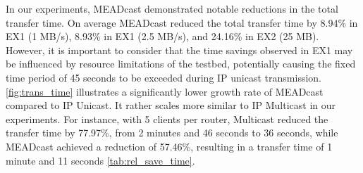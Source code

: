 In our experiments, MEADcast demonstrated notable reductions in the total
    transfer time.
On average MEADcast reduced the total transfer time by 8.94\% in EX1 (1 MB/s),
    8.93\% in EX1 (2.5 MB/s), and 24.16\% in EX2 (25 MB).
However, it is important to consider that the time savings observed in EX1 may
    be influenced by resource limitations of the testbed, potentially causing
    the fixed time period of 45 seconds to be exceeded during IP unicast
    transmission.
\autoref{fig:trans_time} illustrates a significantly lower growth rate of
    MEADcast compared to IP Unicast.
It rather scales more similar to IP Multicast in our experiments.
For instance, with 5 clients per router, Multicast reduced the transfer time
    by 77.97\%, from 2 minutes and 46 seconds to 36 seconds, while MEADcast 
    achieved a reduction of 57.46\%, resulting in a transfer time of 1 minute
    and 11 seconds \autoref{tab:rel_save_time}.




